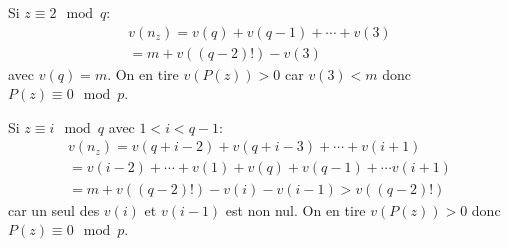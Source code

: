 \begin{enumerate}
Si $z\equiv 2 \mod q$:
\begin{multline*}
  v(n_z) = v(q) + v(q-1) + \cdots + v(3)\\ = m + v((q-2)!) - v(3)
\end{multline*}
avec $v(q)=m$. On en tire $v(P(z))>0$ car $v(3)<m$ donc $P(z) \equiv 0 \mod p$.

Si $z\equiv i \mod q$ avec $1<i<q-1$:
\begin{multline*}
  v(n_z) = v(q+i-2) + v(q+i-3) + \cdots + v(i+1)\\ 
= v(i-2) + \cdots + v(1) + v(q) + v(q-1) + \cdots v(i+1)\\
= m +v((q-2)!) - v(i) - v(i-1) > v((q-2)!)
\end{multline*}
car un seul des $v(i)$ et $v(i-1)$ est non nul. On en tire $v(P(z))>0$ donc $P(z) \equiv 0 \mod p$.

\end{enumerate}
